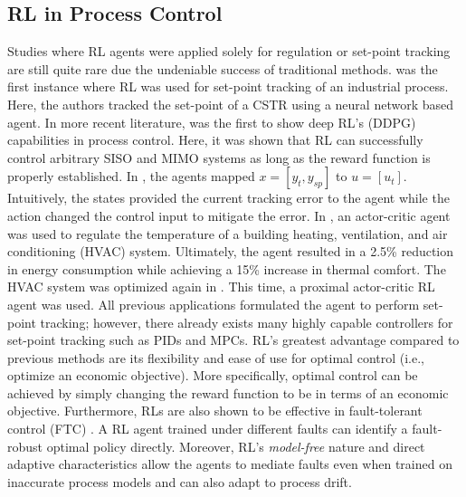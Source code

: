 \subsection{RL in Process Control}
Studies where RL agents were applied solely for regulation or set-point tracking are still quite rare due the undeniable success of traditional methods. \cite{pc} was the first instance where RL was used for set-point tracking of an industrial process. Here, the authors tracked the set-point of a CSTR using a neural network based agent. In more recent literature, \cite{pc1} was the first to show deep RL's (DDPG) capabilities in process control.  Here, it was shown that RL can successfully control arbitrary SISO and MIMO systems as long as the reward function is properly established.  In \cite{pc1}, the agents mapped $x = [y_t, y_{sp}]$ to $u = [u_t]$. Intuitively, the states provided the current tracking error to the agent while the action changed the control input to mitigate the error. In \cite{pc2}, an actor-critic agent was used to regulate the temperature of a building heating, ventilation, and air conditioning (HVAC) system. Ultimately, the agent resulted in a 2.5\% reduction in energy consumption while achieving a 15\% increase in thermal comfort. The HVAC system was optimized again in \cite{pc3}.  This time, a proximal actor-critic RL agent was used. All previous applications formulated the agent to perform set-point tracking; however, there already exists many highly capable controllers for set-point tracking such as PIDs and MPCs. RL's greatest advantage compared to previous methods are its flexibility and ease of use for optimal control (i.e., optimize an economic objective). More specifically, optimal control can be achieved by simply changing the reward function to be in terms of an economic objective. Furthermore, RLs are also shown to be effective in fault-tolerant control (FTC) \cite{ftc}. A RL agent trained under different faults can identify a fault-robust optimal policy directly. Moreover, RL's \textit{model-free} nature and direct adaptive characteristics allow the agents to mediate faults even when trained on inaccurate process models and can also adapt to process drift.













